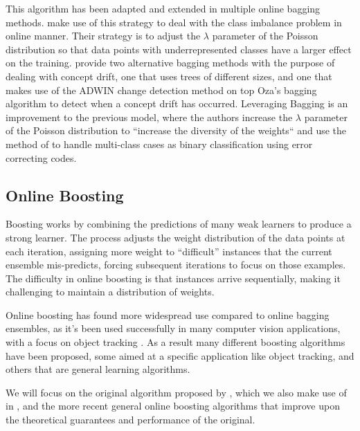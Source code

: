 This algorithm has been adapted and extended in multiple online bagging methods. \citet{online-bag-imbalance}
make use of this strategy to deal with the class imbalance problem in online manner. Their strategy
is to adjust the $\lambda$ parameter of the Poisson distribution so that data points with underrepresented
classes have a larger effect on the training. \citet{new-ensemble-methods} provide two alternative
bagging methods with the purpose of dealing with concept drift, one that uses trees of different
sizes, and one that makes use of the ADWIN \cite{adwin} change detection method on top Oza's bagging algorithm to detect when a concept drift has occurred. Leveraging Bagging \cite{leveraging-bagging} is an improvement to the previous model,
where the authors increase the $\lambda$ parameter of the Poisson distribution to ``increase the diversity of the weights`` and use the method of \citet{multiclass-codes} to handle multi-class cases
as binary classification using error correcting codes.

\subsection{Online Boosting}

Boosting works by combining the predictions of many weak learners to produce a
strong learner. The process adjusts the weight distribution of the data points
at each iteration, assigning more weight to ``difficult'' instances that the
current ensemble mis-predicts, forcing subsequent iterations to focus on those
examples. The difficulty in online boosting is that
instances arrive sequentially, making it challenging to maintain a distribution
of weights.

Online boosting has found more widespread use compared to online bagging ensembles,
as it's been used successfully in many computer vision applications, with a focus on
object tracking \cite{online-boost-cv4, online-boost-cv, online-boost-cv3, online-boost-cv2, online-boost-cv5, online-boost-cv-6}.
As a result many different boosting algorithms have been proposed, some aimed at a specific application like object tracking, and others that are general learning algorithms.

We will focus on the original algorithm proposed by \citeauthor{Oza2001online},
which we also make use of in \boostvht,
and the more recent general online boosting algorithms that improve upon the
theoretical guarantees and performance of the original.

